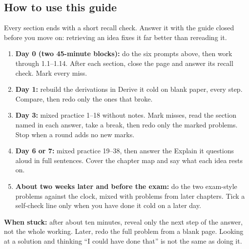 \documentclass[11pt]{article}
\begin{document}
\begin{keepsection}
\section{How to use this guide}

Every section ends with a short recall check. Answer it with the guide closed before you move on: retrieving an idea fixes it far better than rereading it.

\begin{enumerate}
\item \textbf{Day 0 (two 45-minute blocks):} do the six prompts above, then work through 1.1–1.14. After each section, close the page and answer its recall check. Mark every miss.
\item \textbf{Day 1:} rebuild the derivations in Derive it cold on blank paper, every step. Compare, then redo only the ones that broke.
\item \textbf{Day 3:} mixed practice 1–18 without notes. Mark misses, read the section named in each answer, take a break, then redo only the marked problems. Stop when a round adds no new marks.
\item \textbf{Day 6 or 7:} mixed practice 19–38, then answer the Explain it questions aloud in full sentences. Cover the chapter map and say what each idea rests on.
\item \textbf{About two weeks later and before the exam:} do the two exam-style problems against the clock, mixed with problems from later chapters. Tick a self-check line only when you have done it cold on a later day.
\end{enumerate}

\begin{notebox}\textbf{When stuck:} after about ten minutes, reveal only the next step of the answer, not the whole working. Later, redo the full problem from a blank page. Looking at a solution and thinking “I could have done that” is not the same as doing it.\end{notebox}
\end{keepsection}
\end{document}
